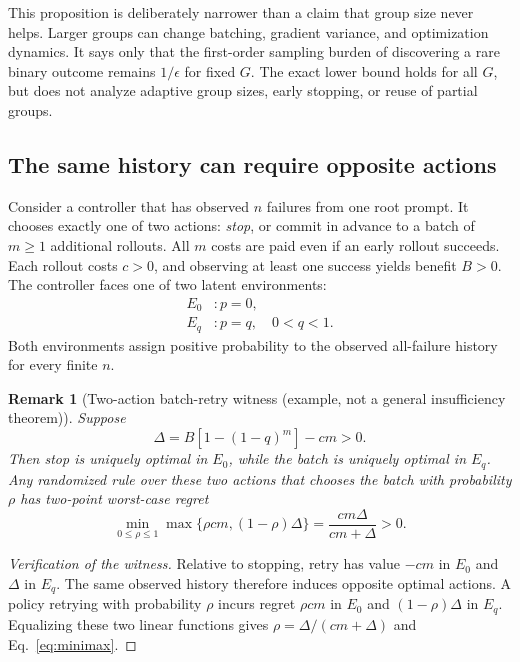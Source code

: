\documentclass{article}
\newtheorem{remark}{Remark}
\begin{document}
This proposition is deliberately narrower than a claim that group size never
helps.  Larger groups can change batching, gradient variance, and optimization
dynamics.  It says only that the first-order sampling burden of discovering a
rare binary outcome remains $1/\epsilon$ for fixed $G$.  The exact lower bound
holds for all $G$, but does not analyze adaptive group sizes, early stopping, or
reuse of partial groups.

\subsection{The same history can require opposite actions}

Consider a controller that has observed $n$ failures from one root prompt.  It
chooses exactly one of two actions: \emph{stop}, or commit in advance to a
batch of $m\geq1$ additional rollouts.  All $m$ costs are paid even if an early
rollout succeeds.  Each rollout costs $c>0$, and observing at least one success
yields benefit $B>0$.
The controller faces one of two latent environments:
\begin{align*}
  E_0 &: p=0,\\
  E_q &: p=q,\quad 0<q<1.
\end{align*}
Both environments assign positive probability to the observed all-failure
history for every finite $n$.

\begin{remark}[Two-action batch-retry witness (example, not a general insufficiency theorem)]
\label{rem:witness}
Suppose
\begin{equation}
  \Delta=B\left[1-(1-q)^m\right]-cm>0.
  \label{eq:delta}
\end{equation}
Then stop is uniquely optimal in $E_0$, while the batch is uniquely optimal in
$E_q$.  Any randomized rule over these two actions that chooses the batch with
probability $\rho$ has two-point worst-case regret
\begin{equation}
  \min_{0\leq\rho\leq1}\max\{\rho cm,(1-\rho)\Delta\}
  =\frac{cm\Delta}{cm+\Delta}>0.
  \label{eq:minimax}
\end{equation}
\end{remark}

\begin{proof}[Verification of the witness]
Relative to stopping, retry has value $-cm$ in $E_0$ and $\Delta$ in $E_q$.
The same observed history therefore induces opposite optimal actions.  A policy
retrying with probability $\rho$ incurs regret $\rho cm$ in $E_0$ and
$(1-\rho)\Delta$ in $E_q$.  Equalizing these two linear functions gives
$\rho=\Delta/(cm+\Delta)$ and Eq.~\eqref{eq:minimax}.
\end{proof}
\end{document}
